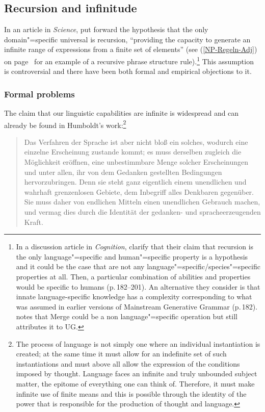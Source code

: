 \subsection{Recursion and infinitude}
\label{Abschnitt-Rekursion}

In an article in \emph{Science}, \citet*{HCF2002a} put forward the hypothesis that the only
domain"=specific universal is recursion, ``providing the capacity to generate an infinite range of expressions from a finite set of elements'' (see (\ref{NP-Regeln-Adj}) on page~\pageref{NP-Regeln-Adj} for an example of a
recursive phrase structure rule).\footnote{%
	In a discussion article in \emph{Cognition}, \citet*{FHC2005a} clarify that their claim that recursion is the only language"=specific and
	human"=specific property is a hypothesis and it could be the case that are not any language"=specific/species"=specific properties at all.
	Then, a particular combination of abilities and properties would be specific to humans
        (p.\,182--201). An alternative they consider is that innate language-specific knowledge has a complexity corresponding to what was assumed in earlier versions of Mainstream Generative Grammar (p.\,182).
%
\citet[]{Chomsky2007a} notes that Merge could be a non language"=specific operation but still attributes it to UG.%
} This assumption is controversial and there have been both formal and empirical objections to it.

\subsubsection{Formal problems}

The claim that our linguistic capabilities are infinite is widespread and can already be found
in Humboldt's work:\footnote{%
The process of language is not simply one where an individual instantiation is created; at the same time it must allow for an
indefinite set of such instantiations and must above all allow the expression of the conditions imposed by thought.
Language faces an infinite and truly unbounded subject matter, the epitome of everything one can think of. Therefore, it must make
infinite use of finite means and this is possible through the identity of the power that is
responsible for the production of thought and language.
}
\begin{quote}
Das Verfahren der Sprache ist aber nicht bloß ein solches, wodurch eine einzelne Erscheinung zustande kommt;
es muss derselben zugleich die Möglichkeit eröffnen, eine unbestimmbare Menge solcher Erscheinungen und unter allen,
ihr von dem Gedanken gestellten Bedingungen hervorzubringen.
Denn sie steht ganz eigentlich einem unendlichen und wahrhaft grenzenlosen Gebiete, dem Inbegriff alles
Denk\-baren gegenüber. Sie muss daher von endlichen Mitteln einen unendlichen Gebrauch machen, und
vermag dies durch die Identität der gedanken- und sprache\-erzeugenden Kraft.  \citep[]{Humboldt88a-u}
\end{quote}

